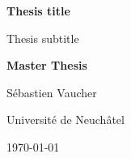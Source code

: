 \documentclass[10pt,a4paper,conference]{IEEEtran}
\author{\IEEEauthorblockN{\myauthor}
    \IEEEauthorblockA{Université de Neuchâtel\\
        Neuchâtel, Switzerland\\
        \href{mailto:sebastien.vaucher@unine.ch}{sebastien.vaucher@unine.ch}}
}
\title{\mytitle}
\def\thesistitle{Thesis title}
\def\thesissubtitle{Thesis subtitle}
\def\myauthor{Sébastien Vaucher}
\begin{document}
\begin{titlepage}
    \begin{otherlanguage}{australian}
        \begin{center}
            \begin{figure}[t]
                \vspace{0.4in}
            \end{figure}

            {\bfseries\Huge \thesistitle \par
                \Large \vspace{0.1in} \thesissubtitle \par}

            \vspace{0.3in}
            \LARGE{\textbf{Master Thesis} \\}
            \vspace{0.4in}

            {\Large \myauthor}

            \vspace{0.3in}
            {\Large Université de Neuchâtel \par}
            \vfill
            {\Large \today \par}

            \vspace{0.9in}


\end{center}
\end{otherlanguage}
\end{titlepage}
\end{document}
